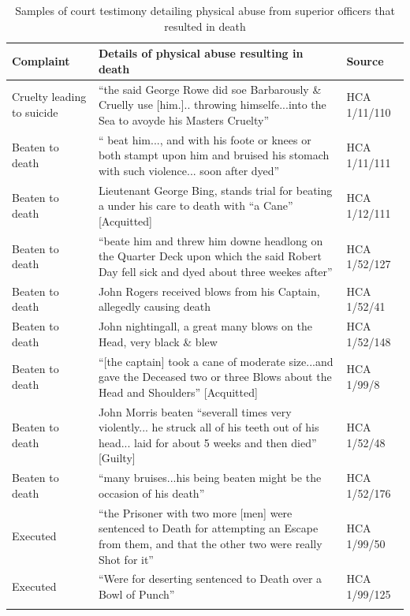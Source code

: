 \begin{table}
\caption{\label{tab:key:4.2} Samples of court testimony detailing physical abuse from superior officers that resulted in death}
\small
\begin{tabularx}{\textwidth}{p{3cm}Ql}
\lsptoprule
\textbf{Complaint} & \textbf{Details} \textbf{of} \textbf{physical} \textbf{abuse} \textbf{resulting} \textbf{in} \textbf{death} & \textbf{Source}\\
\midrule
Cruelty leading to suicide & “the said George Rowe did soe Barbarously \& Cruelly use [him.].. throwing himselfe...into the Sea to avoyde his Masters Cruelty” & HCA 1/11/110\\
Beaten to death & “ beat him..., and with his foote or knees or both stampt upon him and bruised his stomach with such violence... soon after dyed” & HCA 1/11/111\\
Beaten to death & Lieutenant George Bing, stands trial for beating a  under his care to death with “a Cane” [Acquitted] & HCA 1/12/111\\
Beaten to death & “beate him and threw him downe headlong on the Quarter Deck upon which the said Robert Day fell sick and dyed about three weekes after” & HCA 1/52/127\\
Beaten to death & John Rogers received blows from his Captain, allegedly causing death & HCA 1/52/41\\
Beaten to death & John nightingall, a great many blows on the Head, very black \& blew & HCA 1/52/148\\
Beaten to death & “[the captain] took a cane of  moderate size...and gave the Deceased two or three Blows about the Head and Shoulders” [Acquitted] & HCA 1/99/8\\
Beaten to death & John Morris beaten “severall times very violently... he struck all of his teeth out of his head... laid for about 5 weeks and then died” [Guilty] & HCA 1/52/48\\
Beaten to death & “many bruises...his being beaten might be the occasion of his death” & HCA 1/52/176\\
Executed & “the Prisoner with two more [men] were sentenced to Death for attempting an Escape from them, and that the other two were really Shot for it” & HCA 1/99/50\\
Executed & “Were for deserting sentenced to Death over a Bowl of Punch” & HCA 1/99/125\\
\lspbottomrule
\end{tabularx}
\end{table}

